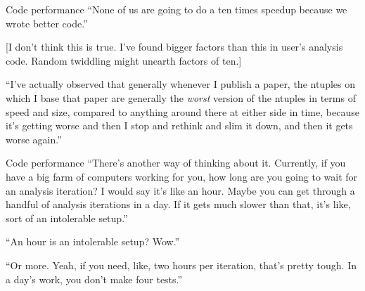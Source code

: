 \documentclass{beamer}
\begin{document}
\begin{frame}{Code performance}
\vspace{0.5 cm}
\textcolor{aug29}{``None of us are going to do a ten times speedup because we wrote better code.''}

\begin{center}
\begin{minipage}{0.9\linewidth}
[I don't think this is true. I've found bigger factors than this in user's analysis code. Random twiddling might unearth factors of ten.]
\end{minipage}
\end{center}

\vfill
\textcolor{aug29}{``I've actually observed that generally whenever I publish a paper, the ntuples on which I base that paper are generally the {\it worst} version of the ntuples in terms of speed and size, compared to anything around there at either side in time, because it's getting worse and then I stop and rethink and slim it down, and then it gets worse again.''}
\end{frame}

\begin{frame}{Code performance}
\vspace{0.5 cm}
\textcolor{aug31}{``There's another way of thinking about it. Currently, if you have a big farm of computers working for you, how long are you going to wait for an analysis iteration? I would say it's like an hour. Maybe you can get through a handful of analysis iterations in a day. If it gets much slower than that, it's like, sort of an intolerable setup.''}

\vspace{0.5 cm}
\textcolor{aug31}{``An hour is an intolerable setup? Wow.''}

\vspace{0.5 cm}
\textcolor{aug31}{``Or more. Yeah, if you need, like, two hours per iteration, that's pretty tough. In a day's work, you don't make four tests.''}
\end{frame}
\end{document}
